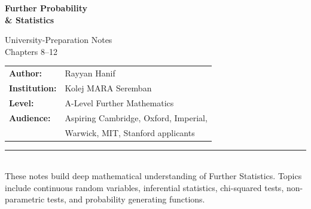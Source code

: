 \documentclass[12pt, a4paper, oneside]{book}
\theoremstyle{definition}
\theoremstyle{plain}
\theoremstyle{remark}
\begin{document}
\begin{titlepage}

\vspace*{3.5cm}
{\color{white}\fontsize{32}{40}\selectfont\bfseries Further Probability\\[6pt] \& Statistics\par}
\vspace{0.8cm}
{\color{white!80!PrimaryBlue}\fontsize{16}{22}\selectfont
 University-Preparation Notes\\[4pt]
 Chapters 8--12\par}

\vspace{3cm}
\noindent
{\fontsize{13}{18}\selectfont\color{DarkGrey}
\begin{tabular}{@{}ll}
\textbf{Author:}  & Rayyan Hanif \\[4pt]
\textbf{Institution:} & Kolej MARA Seremban \\[4pt]
\textbf{Level:}   & A-Level Further Mathematics \\[4pt]
\textbf{Audience:} & Aspiring Cambridge, Oxford, Imperial, \\
                   & Warwick, MIT, Stanford applicants \\
\end{tabular}}

\vfill
\noindent\rule{\linewidth}{0.4pt}\\[4pt]
{\small\color{MidGrey}
These notes build deep mathematical understanding of Further Statistics.
Topics include continuous random variables, inferential statistics,
chi-squared tests, non-parametric tests, and probability generating functions.}
\end{titlepage}

\end{document}
